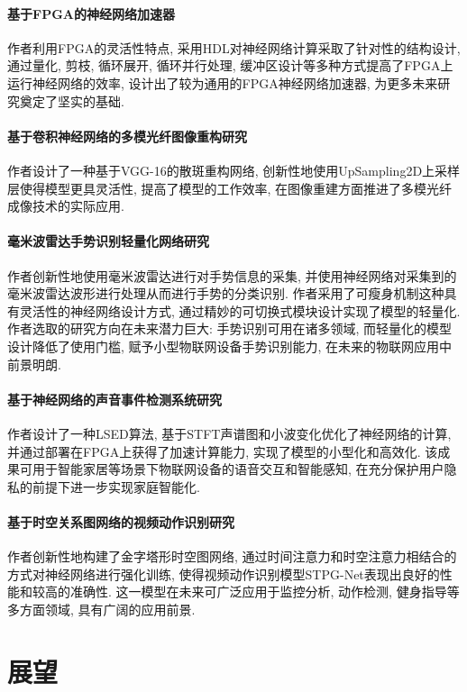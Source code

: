\documentclass[]{ctexart}
\begin{document}
\paragraph{基于FPGA的神经网络加速器\cite{fpgaAccelerate}} 作者利用FPGA的灵活性特点, 采用HDL对神经网络计算采取了针对性的结构设计, 通过量化, 剪枝, 循环展开, 循环并行处理, 缓冲区设计等多种方式提高了FPGA上运行神经网络的效率, 设计出了较为通用的FPGA神经网络加速器, 为更多未来研究奠定了坚实的基础. 

\paragraph{基于卷积神经网络的多模光纤图像重构研究\cite{fiber}} 作者设计了一种基于VGG-16的散斑重构网络, 创新性地使用UpSampling2D上采样层使得模型更具灵活性, 提高了模型的工作效率, 在图像重建方面推进了多模光纤成像技术的实际应用. 

\paragraph{毫米波雷达手势识别轻量化网络研究\cite{radar}} 作者创新性地使用毫米波雷达进行对手势信息的采集, 并使用神经网络对采集到的毫米波雷达波形进行处理从而进行手势的分类识别. 作者采用了可瘦身机制这种具有灵活性的神经网络设计方式, 通过精妙的可切换式模块设计实现了模型的轻量化. 作者选取的研究方向在未来潜力巨大: 手势识别可用在诸多领域, 而轻量化的模型设计降低了使用门槛, 赋予小型物联网设备手势识别能力, 在未来的物联网应用中前景明朗. 

\paragraph{基于神经网络的声音事件检测系统研究\cite{sound}} 作者设计了一种LSED算法, 基于STFT声谱图和小波变化优化了神经网络的计算, 并通过部署在FPGA上获得了加速计算能力, 实现了模型的小型化和高效化. 该成果可用于智能家居等场景下物联网设备的语音交互和智能感知, 在充分保护用户隐私的前提下进一步实现家庭智能化. 

\paragraph{基于时空关系图网络的视频动作识别研究\cite{videoAction}} 作者创新性地构建了金字塔形时空图网络, 通过时间注意力和时空注意力相结合的方式对神经网络进行强化训练, 使得视频动作识别模型STPG-Net表现出良好的性能和较高的准确性. 这一模型在未来可广泛应用于监控分析, 动作检测, 健身指导等多方面领域, 具有广阔的应用前景. 

\section{展望}
\end{document}
